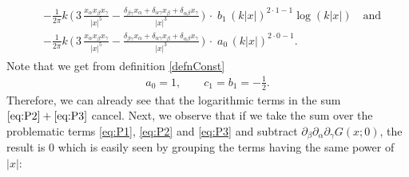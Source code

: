 \begin{align}
  \label{eq:P3}
  \tag{P3}
  \begin{alignedat}{1}
    &- \frac{1}{2\pi} k\, \bigg( \, 3\, \frac{x_\alpha x_\beta x_\gamma}{|x|^5} - \frac{\delta_{\beta\gamma} x_\alpha + \delta_{\alpha\gamma} x_\beta + \delta_{\alpha\beta} x_\gamma}{|x|^3} \, \bigg)
    \, \cdot \; b_1 \, (k|x|)^{2 \cdot 1 - 1} \log(k|x|)  \quad\text{and}\\[0.5em]
    &- \frac{1}{2\pi} k\, \bigg( \, 3\, \frac{x_\alpha x_\beta x_\gamma}{|x|^5} - \frac{\delta_{\beta\gamma} x_\alpha + \delta_{\alpha\gamma} x_\beta + \delta_{\alpha\beta} x_\gamma}{|x|^3} \, \bigg)
  \, \cdot \; a_0 \, (k|x|)^{2 \cdot 0 - 1} .
  \end{alignedat}
\end{align}
Note that we get from definition \eqref{defnConst}
\begin{align*}
  a_0 = 1, \qquad c_1 = b_1 = - \frac{1}{2}.
\end{align*}
Therefore, we can already see that the logarithmic terms in the sum $\eqref{eq:P2} + \eqref{eq:P3}$ cancel.
Next, we observe that if we take the sum over the problematic terms \eqref{eq:P1}, \eqref{eq:P2} and \eqref{eq:P3} and subtract $\partial_\beta \partial_\alpha \partial_\gamma G(x; 0)$, the result is $0$ which is easily seen by grouping the terms having the same power of $|x|$:
